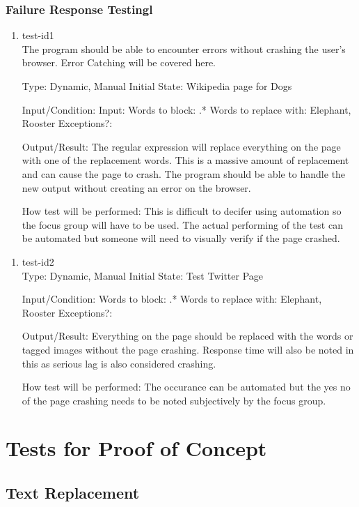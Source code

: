 \documentclass[12pt, titlepage]{article}
\begin{document}
\subsubsection{Failure Response Testingl} %
\begin{enumerate}
\item{test-id1\\}
The program should be able to encounter errors without crashing the user's browser. Error Catching will be covered here.

Type: Dynamic, Manual
Initial State: Wikipedia page for Dogs
					
Input/Condition: Input: Words to block: .*
Words to replace with: Elephant, Rooster
Exceptions?: 
					
Output/Result: The regular expression will replace everything on the page with one of the replacement words. This is a massive amount of replacement and can cause the page to crash. The program should be able to handle the new output without creating an error on the browser.
					
How test will be performed: This is difficult to decifer using automation so the focus group will have to be used. The actual performing of the test can be automated but someone will need to visually verify if the page crashed.
\end{enumerate}
\begin{enumerate}
\item{test-id2\\}
Type: Dynamic, Manual
Initial State: Test Twitter Page
					
Input/Condition: Words to block: .*
Words to replace with: Elephant, Rooster
Exceptions?: 
					
Output/Result: Everything on the page should be replaced with the words or tagged images without the page crashing. Response time will also be noted in this as serious lag is also considered crashing.
					
How test will be performed: The occurance can be automated but the yes no of the page crashing needs to be noted subjectively by the focus group.
\end{enumerate}
\section{Tests for Proof of Concept}
\subsection{Text Replacement}
		
\end{document}
